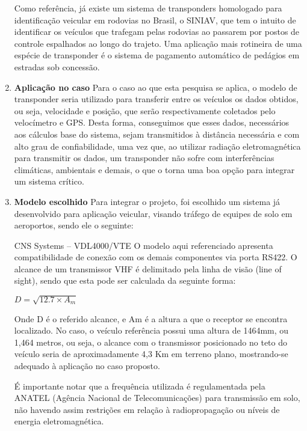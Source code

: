 \begin{enumerate}
Como referência, já existe um sistema de transponders homologado
para identificação veicular em rodovias no Brasil, o SINIAV, que
tem o intuito de identificar os veículos que trafegam pelas
rodovias ao passarem por postos de controle espalhados ao longo do
trajeto. Uma aplicação mais rotineira de uma espécie de transponder
é o sistema de pagamento automático de pedágios em estradas sob concessão.

\item \textbf{Aplicação no caso}
Para o caso ao que esta pesquisa se aplica, o modelo de transponder seria
utilizado para transferir entre os veículos os dados obtidos, ou seja,
velocidade e posição, que serão respectivamente coletados pelo velocímetro
e GPS. Desta forma, conseguimos que esses dados, necessários aos cálculos
base do sistema, sejam transmitidos à distância necessária e com alto grau
de confiabilidade, uma vez que, ao utilizar radiação eletromagnética para
transmitir os dados, um transponder não sofre com interferências climáticas,
ambientais e demais, o que o torna uma boa opção para integrar um sistema crítico.

\item \textbf{Modelo escolhido}
Para integrar o projeto, foi escolhido um sistema já desenvolvido para aplicação
veicular, visando tráfego de equipes de solo em aeroportos, sendo ele o seguinte:

CNS Systems – VDL4000/VTE \cite{datasheet_transponder}
O modelo aqui referenciado apresenta compatibilidade de conexão com os demais
componentes via porta RS422. O alcance de um transmissor VHF é delimitado pela
 linha de visão (line of sight), sendo que esta pode ser calculada da seguinte
 forma:

 $ D = \sqrt{12.7 \times A_{m}} $

 Onde D é o referido alcance, e Am é a altura a que o receptor se encontra
 localizado. No caso, o veículo referência possui uma altura de 1464mm, ou
 1,464 metros, ou seja, o alcance com o transmissor posicionado no teto do
 veículo seria de aproximadamente 4,3 Km em terreno plano, mostrando-se
 adequado à aplicação no caso proposto.

 É importante notar que a frequência utilizada é regulamentada pela ANATEL
 (Agência Nacional de Telecomunicações) para transmissão em solo, não havendo
  assim restrições em relação à radiopropagação ou níveis de energia
  eletromagnética.

\end{enumerate}
